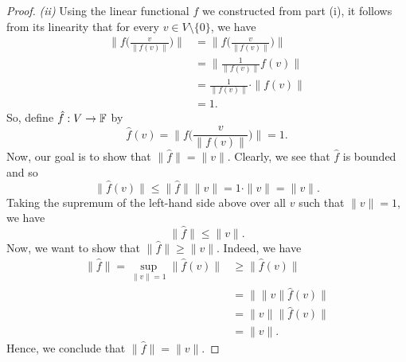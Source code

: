 \documentclass[a4paper]{article}
\begin{document}
\begin{proof}
\textit{(ii)} Using the linear functional \( f  \) we constructed from part (i), it follows from its linearity that for every \( v \in V \setminus  \{  0  \}  \), we have 
\begin{align*}
     \Big\| f \Big(  \frac{ v  }{  \| f(v) \| }  \Big) \Big\| &= \Big\| f \Big(  \frac{ v  }{  \|f(v)\| }  \Big)\Big\|   \\
                                                   &= \Big\| \frac{ 1  }{  \|f(v)\| }  f(v) \Big\| \\
                                                   &= \frac{ 1  }{ \|f(v)\| }  \cdot \|f(v)\| \\
                                                   &= 1.
\end{align*}
So, define \( \hat{f}: V \to \mathbb{F}  \) by
\[  \hat{f}(v) = \Big\| f \Big(  \frac{  v  }{  \| f(v) \| }  \Big)\Big\| = 1. \]
Now, our goal is to show that \( \|\hat{f}\| = \|v \| \). Clearly, we see that \( \hat{f} \) is bounded and so 
\[  \|\hat{f}(v)\| \leq \|\hat{f}\| \|v \| = 1 \cdot \|v\| = \|v\|. \]
Taking the supremum of the left-hand side above over all \( v  \) such that \( \|v \| = 1  \), we have
\[  \|\hat{f}\| \leq \|v\|.  \]
Now, we want to show that \( \|\hat{f}\| \geq \|v \| \). Indeed, we have
\begin{align*}
    \|\hat{f}\| = \sup_{\|v\| = 1} \|\hat{f}(v)\| &\geq \|\hat{f}(v)\|  \\ 
                                                  &= \Big\| \|v \| \hat{f}(v) \Big\| \\
                                                  &= \|v \| \| \hat{f}(v) \| \\
                                                  &= \|v\|. 
\end{align*}
Hence, we conclude that \( \|\hat{f}\| = \|v\| \).
\end{proof}
\end{document}
